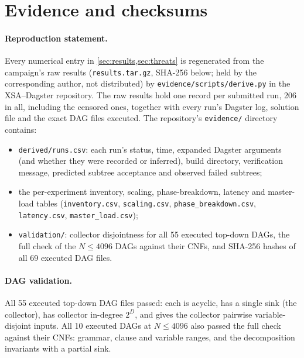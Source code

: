 \documentclass[11pt,a4paper]{article}
\begin{document}
\section{Evidence and checksums}
\label{app:evidence}
\paragraph{Reproduction statement.}
Every numerical entry in \cref{sec:results,sec:threats} is regenerated from the campaign's raw
results (\texttt{results.tar.gz}, SHA-256 below; held by the corresponding author, not
distributed) by \texttt{evidence/scripts/derive.py} in the XSA--Dagster repository. The raw
results hold one record per
submitted run, 206 in all, including the censored ones, together with every run's Dagster
log, solution file and the exact DAG files executed. The repository's \texttt{evidence/}
directory contains:
\begin{itemize}
\item \texttt{derived/runs.csv}: each run's status, time, expanded Dagster arguments (and
      whether they were recorded or inferred), build directory, verification message,
      predicted subtree acceptance and observed failed subtrees;
\item the per-experiment inventory, scaling, phase-breakdown, latency and master-load
      tables (\texttt{inventory.csv}, \texttt{scaling.csv}, \texttt{phase\_breakdown.csv},
      \texttt{latency.csv}, \texttt{master\_load.csv});
\item \texttt{validation/}: collector disjointness for all 55 executed top-down DAGs, the
      full check of the $N\le 4096$ DAGs against their CNFs, and SHA-256 hashes of all 69
      executed DAG files.
\end{itemize}

\paragraph{DAG validation.}
All 55 executed top-down DAG files passed: each is acyclic, has a single sink (the
collector), has collector in-degree $2^D$, and gives the collector pairwise
variable-disjoint inputs. All 10 executed DAGs at $N\le 4096$ also passed the full check
against their CNFs: grammar, clause and variable ranges, and the decomposition invariants
with a partial sink.
\end{document}
